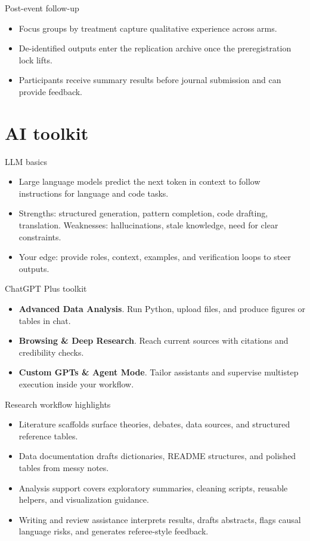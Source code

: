 \documentclass[aspectratio=169,professionalfonts]{beamer}
\newcommand{\feature}[1]{\textbf{#1}}
\begin{document}
\begin{frame}{Post-event follow-up}
  \begin{itemize}
    \item Focus groups by treatment capture qualitative experience across arms.
    \item De-identified outputs enter the replication archive once the preregistration lock lifts.
    \item Participants receive summary results before journal submission and can provide feedback.
  \end{itemize}
\end{frame}

\section{AI toolkit}

\begin{frame}{LLM basics}
  \begin{itemize}
    \item Large language models predict the next token in context to follow instructions for language and code tasks.
    \item Strengths: structured generation, pattern completion, code drafting, translation. Weaknesses: hallucinations, stale knowledge, need for clear constraints.
    \item Your edge: provide roles, context, examples, and verification loops to steer outputs.
  \end{itemize}
\end{frame}

\begin{frame}{ChatGPT Plus toolkit}
  \begin{itemize}
    \item \feature{Advanced Data Analysis}. Run Python, upload files, and produce figures or tables in chat.
    \item \feature{Browsing \& Deep Research}. Reach current sources with citations and credibility checks.
    \item \feature{Custom GPTs \& Agent Mode}. Tailor assistants and supervise multistep execution inside your workflow.
  \end{itemize}
\end{frame}

\begin{frame}{Research workflow highlights}
  \begin{itemize}
    \item Literature scaffolds surface theories, debates, data sources, and structured reference tables.
    \item Data documentation drafts dictionaries, README structures, and polished tables from messy notes.
    \item Analysis support covers exploratory summaries, cleaning scripts, reusable helpers, and visualization guidance.
    \item Writing and review assistance interprets results, drafts abstracts, flags causal language risks, and generates referee-style feedback.
  \end{itemize}
\end{frame}
\end{document}
